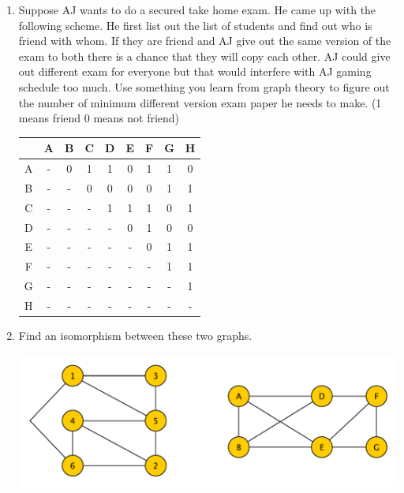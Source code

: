 \documentclass[a4paper, 12pt]{article}
\newcommand{\manswer}{\vspace{2.5in}}
\begin{document}
\begin{enumerate}
\begin{enumerate}
\begin{center}
			\end{center}
		\newpage
		\item Suppose AJ wants to do a secured take home exam. He came up with the following scheme. He first list out the list of students and find out who is friend with whom. If they are friend and AJ give out the same version of the exam to both there is a chance that they will copy each other. AJ could give out different exam for everyone but that would interfere with AJ gaming schedule too much. Use something you learn from graph theory to figure out the number of minimum different version exam paper he needs to make. (1 means friend 0 means not friend)
		
		\begin{center}
			\begin{tabular}{|c|c|c|c|c|c|c|c|c|}
				\hline
				 & A & B & C & D & E & F & G & H\\
				 \hline
				 A & - & 0 & 1 & 1 & 0 & 1 & 1 & 0\\
				 B & - & - & 0 & 0 & 0 & 0 & 1 & 1\\
				 C & - & - & - & 1 & 1 & 1 & 0 & 1\\
				 D & - & - & - & - & 0 & 1 & 0 & 0\\
				 E & - & - & - & - & - & 0 & 1 & 1\\
				 F & - & - & - & - & - & - & 1 & 1\\
				 G & - & - & - & - & - & - & - & 1\\
				 H & - & - & - & - & - & - & - & -\\
				\hline
			\end{tabular} 
		\end{center}
		\manswer
		
		\item Find an isomorphism between these two graphs.	
		\begin{center}
		\includegraphics[width=0.7\linewidth]{isomorphism1}
		\end{center}
		
	\end{enumerate}
		

\end{enumerate}
\end{document}
